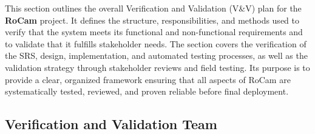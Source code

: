 \documentclass[12pt, titlepage]{article}
\begin{document}
This section outlines the overall Verification and Validation (V\&V) plan for
the \textbf{RoCam} project. It defines the structure, responsibilities, and
methods used to verify that the system meets its functional and non-functional
requirements and to validate that it fulfills stakeholder needs. The section
covers the verification of the SRS, design, implementation, and automated
testing processes, as well as the validation strategy through stakeholder
reviews and field testing. Its purpose is to provide a clear, organized
framework ensuring that all aspects of RoCam are systematically tested,
reviewed, and proven reliable before final deployment. 

\subsection{Verification and Validation Team}
\end{document}
